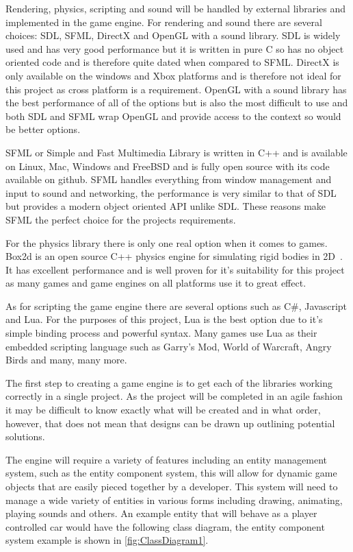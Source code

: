\documentclass[11pt,a4paper,titlepage]{article}
\begin{document}
	Rendering, physics, scripting and sound will be handled by external libraries and implemented in the game engine. For rendering and sound there are several choices: SDL, SFML, DirectX and OpenGL with a sound library. SDL is widely used and has very good performance but it is written in pure C so has no object oriented code and is therefore quite dated when compared to SFML. DirectX is only available on the windows and Xbox platforms and is therefore not ideal for this project as cross platform is a requirement. OpenGL with a sound library has the best performance of all of the options but is also the most difficult to use and both SDL and SFML wrap OpenGL and provide access to the context so would be better options.

	SFML or Simple and Fast Multimedia Library is written in C++ and is available on Linux, Mac, Windows and FreeBSD and is fully open source with its code available on github. SFML handles everything from window management and input to sound and networking, the performance is very similar to that of SDL but provides a modern object oriented API unlike SDL. These reasons make SFML the perfect choice for the projects requirements.

	For the physics library there is only one real option when it comes to games. Box2d is an open source C++ physics engine for simulating rigid bodies in 2D~\cite{Box2D}. It has excellent performance and is well proven for it's suitability for this project as many games and game engines on all platforms use it to great effect.

	As for scripting the game engine there are several options such as C\#, Javascript and Lua. For the purposes of this project, Lua is the best option due to it's simple binding process and powerful syntax. Many games use Lua as their embedded scripting language such as Garry's Mod, World of Warcraft, Angry Birds and many, many more.


	The first step to creating a game engine is to get each of the libraries working correctly in a single project. As the project will be completed in an agile fashion it may be difficult to know exactly what will be created and in what order, however, that does not mean that designs can be drawn up outlining potential solutions.

	The engine will require a variety of features including an entity management system, such as the entity component system, this will allow for dynamic game objects that are easily pieced together by a developer. This system will need to manage a wide variety of entities in various forms including drawing, animating, playing sounds and others. An example entity that will behave as a player controlled car would have the following class diagram, the entity component system example is shown in \ref{fig:ClassDiagram1}.
\end{document}

